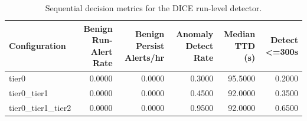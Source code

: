 \begin{table}[t]
\centering
\caption{Sequential decision metrics for the DICE run-level detector.}
\label{tab:dice_sequential_metrics}
\footnotesize
\begin{tabular}{lrrrrr}
\toprule
Configuration & Benign Run-Alert Rate & Benign Persist Alerts/hr & Anomaly Detect Rate & Median TTD (s) & Detect <=300s \\
\midrule
tier0 & 0.0000 & 0.0000 & 0.3000 & 95.5000 & 0.2000 \\
tier0_tier1 & 0.0000 & 0.0000 & 0.4500 & 92.0000 & 0.3500 \\
tier0_tier1_tier2 & 0.0000 & 0.0000 & 0.9500 & 92.0000 & 0.6500 \\
\bottomrule
\end{tabular}

\end{table}
